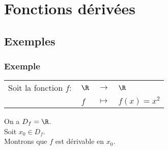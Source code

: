 \ifdefined\COMPLETE
\else
    
    
\fi

\section{Fonctions dérivées}

\subsection{Exemples}

\subsubsection{Exemple }

\begin{tabular}{llll}
Soit la fonction $f :$ & $\R$ & $\longrightarrow$ & $\R$ \\
& $f$ & $\longmapsto$ & $f(x) = x^2$ \\
\end{tabular}

On a $D_f = \R$. \\

Soit $x_0 \in D_f$. \\

Montrons que $f$ est dérivable en $x_0$. \\

